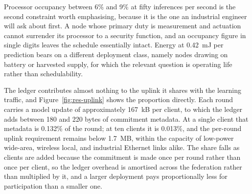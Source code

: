 Processor occupancy between 6\% and 9\% at fifty inferences per second is the second constraint worth emphasising, because it is the one an industrial engineer will ask about first. A node whose primary duty is measurement and actuation cannot surrender its processor to a security function, and an occupancy figure in single digits leaves the schedule essentially intact. Energy at 0.42~mJ per prediction bears on a different deployment class, namely nodes drawing on battery or harvested supply, for which the relevant question is operating life rather than schedulability.

The ledger contributes almost nothing to the uplink it shares with the learning traffic, and Figure~\ref{fig:res-uplink} shows the proportion directly. Each round carries a model update of approximately 167~kB per client, to which the ledger adds between 180 and 220 bytes of commitment metadata. At a single client that metadata is 0.132\% of the round; at ten clients it is 0.013\%, and the per-round uplink requirement remains below 1.7~MB, within the capacity of low-power wide-area, wireless local, and industrial Ethernet links alike. The share falls as clients are added because the commitment is made once per round rather than once per client, so the ledger overhead is amortised across the federation rather than multiplied by it, and a larger deployment pays proportionally less for participation than a smaller one.


